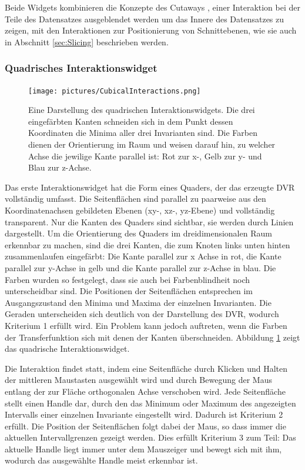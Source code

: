 \documentclass[a4paper,fontsize=12pt,toc=bib,halfparskip]{scrartcl}
\begin{document}
Beide Widgets kombinieren die Konzepte des Cutaways \cite[S.~406f]{preim2015interaktive}, einer Interaktion bei der Teile des Datensatzes ausgeblendet werden um das Innere des Datensatzes zu zeigen, mit den Interaktionen zur Positionierung von Schnittebenen, wie sie auch in Abschnitt \ref{sec:Slicing} beschrieben werden. 

\subsubsection{Quadrisches Interaktionswidget}

\begin{figure}
	\texttt{[image: pictures/CubicalInteractions.png]}
	\label{CubicalInteractions}
	\caption{Eine Darstellung des quadrischen Interaktionswidgets. Die drei eingef\"arbten Kanten schneiden sich in dem Punkt dessen Koordinaten die Minima aller drei Invarianten sind. Die Farben dienen der Orientierung im Raum und weisen darauf hin, zu welcher Achse die jewilige Kante parallel ist: Rot zur x-, Gelb zur y- und Blau zur z-Achse.}
\end{figure}

Das erste Interaktionswidget hat die Form eines Quaders, der das erzeugte DVR vollst\"andig umfasst. Die Seitenfl\"achen sind parallel zu paarweise aus den Koordinatenachsen gebildeten Ebenen (xy-, xz-, yz-Ebene) und vollst\"andig transparent. Nur die Kanten des Quaders sind sichtbar, sie werden durch Linien dargestellt. Um die Orientierung des Quaders im dreidimensionalen Raum erkennbar zu machen, sind die drei Kanten, die zum Knoten links unten hinten zusammenlaufen eingef\"arbt: Die Kante parallel zur x Achse in rot, die Kante parallel zur y-Achse in gelb und die Kante parallel zur z-Achse in blau. Die Farben wurden so festgelegt, dass sie auch bei Farbenblindheit noch unterscheidbar sind. Die Positionen der Seitenfl\"achen entsprechen im Ausgangszustand den Minima und Maxima der einzelnen Invarianten. Die Geraden unterscheiden sich deutlich von der Darstellung des DVR, wodurch Kriterium 1 erf\"ullt wird. Ein Problem kann jedoch auftreten, wenn die Farben der Transferfunktion sich mit denen der Kanten \"uberschneiden. Abbildung \ref{CubicalInteractions} zeigt das quadrische Interaktionswidget.

Die Interaktion findet statt, indem eine Seitenfl\"ache durch Klicken und Halten der mittleren Maustasten ausgew\"ahlt wird und durch Bewegung der Maus entlang der zur Fl\"ache orthogonalen Achse verschoben wird. Jede Seitenfl\"ache stellt einen Handle dar, durch den das Minimum oder Maximum des angezeigten Intervalls einer einzelnen Invariante eingestellt wird. Dadurch ist Kriterium 2 erf\"ullt. Die Position der Seitenfl\"achen folgt dabei der Maus, so dass immer die aktuellen Intervallgrenzen gezeigt werden. Dies erf\"ullt Kriterium 3 zum Teil: Das aktuelle Handle liegt immer unter dem Mauszeiger und bewegt sich mit ihm, wodurch das ausgew\"ahlte Handle meist erkennbar ist. 
\end{document}
